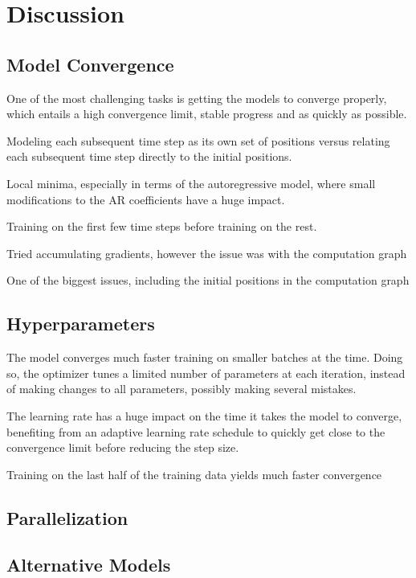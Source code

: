 \chapter{Discussion}\label{ch:Discussion}

\section{Model Convergence}

One of the most challenging tasks is getting the models to converge properly, which entails a high convergence limit, stable progress and as quickly as possible.

Modeling each subsequent time step as its own set of positions versus relating each subsequent time step directly to the initial positions.

Local minima, especially in terms of the autoregressive model, where small modifications to the AR coefficients have a huge impact.


Training on the first few time steps before training on the rest.


Tried accumulating gradients, however the issue was with the computation graph

One of the biggest issues, including the initial positions in the computation graph


\section{Hyperparameters}

The model converges much faster training on smaller batches at the time. Doing so, the optimizer tunes a limited number of parameters at each iteration, instead of making changes to all parameters, possibly making several mistakes.

The learning rate has a huge impact on the time it takes the model to converge, benefiting from an adaptive learning rate schedule to quickly get close to the convergence limit before reducing the step size.



Training on the last half of the training data yields much faster convergence

\section{Parallelization}

\section{Alternative Models}